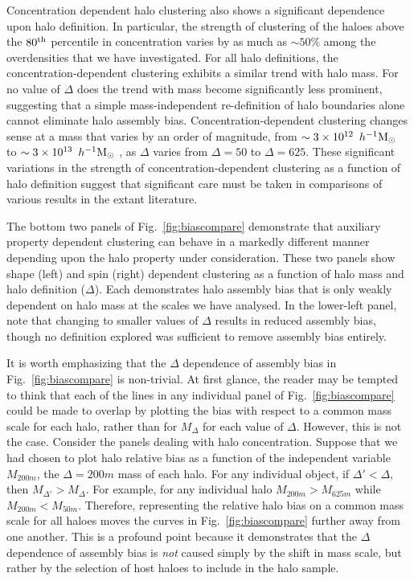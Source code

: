 \documentclass[usenatbib,fleqn]{mnras}
\begin{document}
Concentration dependent halo clustering also shows a significant dependence upon halo definition. In particular, the strength of clustering of the haloes above the $80^{\rm{th}}$ percentile in concentration varies by as much as $\sim 50\%$ among the overdensities that we have investigated. For all halo definitions, 
the concentration-dependent clustering exhibits a similar trend with halo mass. For no value of $\Delta$ does the trend with mass become significantly less prominent, suggesting that a simple mass-independent re-definition of halo boundaries alone cannot eliminate halo assembly bias. Concentration-dependent clustering changes sense at a mass that varies by an order of magnitude, from $\sim 3 \times 10^{12}\, \ h^{-1}\mathrm{M}_{\odot}~$ to $\sim 3 \times 10^{13}\, \ h^{-1}\mathrm{M}_{\odot}~$, as $\Delta$ varies from $\Delta=50$ to $\Delta=625$. These significant variations in the strength of concentration-dependent clustering as a function of halo definition suggest that significant care must be taken in comparisons of various results in the extant literature.

The bottom two panels of Fig.~\ref{fig:biascompare} demonstrate that auxiliary property dependent clustering can behave in a markedly different manner depending upon the halo property under consideration. These two panels show shape (left) and spin (right) dependent clustering as a function of halo mass and halo definition ($\Delta$). Each demonstrates halo assembly bias that is only weakly dependent on halo mass at the scales we have analysed. In the lower-left panel, note that changing to smaller values of $\Delta$ results in reduced assembly bias, though no definition explored was sufficient to remove assembly bias entirely. 

It is worth emphasizing that the $\Delta$ dependence of assembly bias in Fig.~\ref{fig:biascompare} is non-trivial. At first glance, the reader may be tempted to think that each of the lines in any individual panel of Fig.~\ref{fig:biascompare} could be made to overlap by plotting the bias with respect to a common mass scale for each halo, rather than for $M_{\Delta}$ for each value of $\Delta$. However, this is not the case. Consider the panels dealing with halo concentration. Suppose that we had chosen to plot halo relative bias as a function of the independent variable $M_{200m}$, the $\Delta=200m$ mass of each halo. For any individual object, if $\Delta' < \Delta$, then $M_{\Delta'} > M_{\Delta}$. For example, for any individual halo $M_{200m} > M_{625m}$ while $M_{200m} < M_{50m}$. Therefore, representing the relative halo bias on a common mass scale for all haloes moves the curves in Fig.~\ref{fig:biascompare} further away from one another. This is a profound point because it demonstrates that the $\Delta$ dependence of assembly bias is {\em not} caused simply by the shift in mass scale, but rather by the selection of host haloes to include in the halo sample. 
\end{document}
